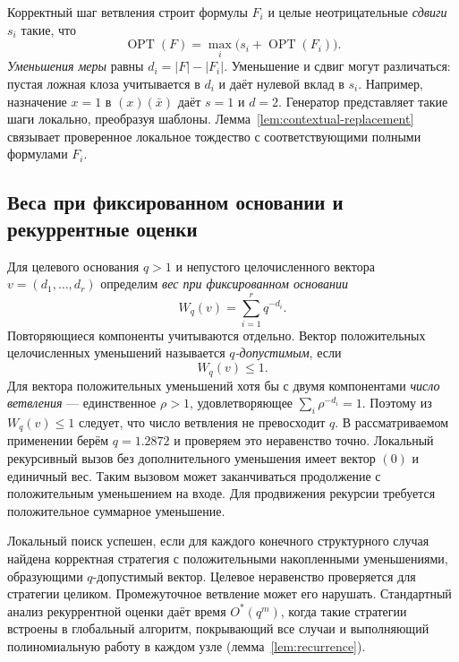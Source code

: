 \documentclass[10pt,twoside]{article}
\newcommand{\OhStar}{O^*}
\newcommand{\OPT}{\operatorname{OPT}}
\theoremstyle{definition}
\theoremstyle{remark}
\begin{document}
Корректный шаг ветвления строит формулы $F_i$ и целые неотрицательные
\emph{сдвиги} $s_i$ такие, что
\[
  \OPT(F)=\max_i\bigl(s_i+\OPT(F_i)\bigr).
\]
\emph{Уменьшения меры} равны $d_i=|F|-|F_i|$. Уменьшение и сдвиг могут
различаться: пустая ложная клоза учитывается в $d_i$ и даёт нулевой вклад
в $s_i$. Например, назначение $x=1$ в $(x)(\bar x)$ даёт $s=1$ и $d=2$.
Генератор представляет такие шаги локально, преобразуя шаблоны.
Лемма~\ref{lem:contextual-replacement} связывает проверенное локальное
тождество с соответствующими полными формулами $F_i$.

\subsection{Веса при фиксированном основании и рекуррентные оценки}
\label{sec:weights}

Для целевого основания $q>1$ и непустого целочисленного вектора
$v=(d_1,\ldots,d_r)$ определим \emph{вес при фиксированном основании}
\begin{equation}
 W_q(v)=\sum_{i=1}^{r}q^{-d_i}.
 \label{eq:weight}
\end{equation}
Повторяющиеся компоненты учитываются отдельно. Вектор положительных
целочисленных уменьшений называется \emph{$q$-допустимым}, если
\begin{equation}
  W_q(v)\le 1.
  \label{eq:target}
\end{equation}
Для вектора положительных уменьшений хотя бы с двумя компонентами
\emph{число ветвления} --- единственное $\rho>1$, удовлетворяющее
$\sum_i\rho^{-d_i}=1$. Поэтому из $W_q(v)\le1$ следует, что число
ветвления не превосходит $q$.
В рассматриваемом применении берём $q=1.2872$ и проверяем это неравенство
точно. Локальный рекурсивный вызов без дополнительного уменьшения имеет
вектор $(0)$ и единичный вес. Таким вызовом может заканчиваться продолжение
с положительным уменьшением на входе. Для продвижения рекурсии требуется
положительное суммарное уменьшение.

Локальный поиск успешен, если для каждого конечного структурного случая
найдена корректная стратегия с положительными накопленными уменьшениями,
образующими $q$-допустимый вектор. Целевое неравенство проверяется для
стратегии целиком. Промежуточное ветвление может его нарушать. Стандартный
анализ рекуррентной оценки даёт время $\OhStar(q^m)$, когда такие стратегии
встроены в глобальный алгоритм, покрывающий все случаи и выполняющий
полиномиальную работу в каждом узле (лемма~\ref{lem:recurrence}).
\end{document}
